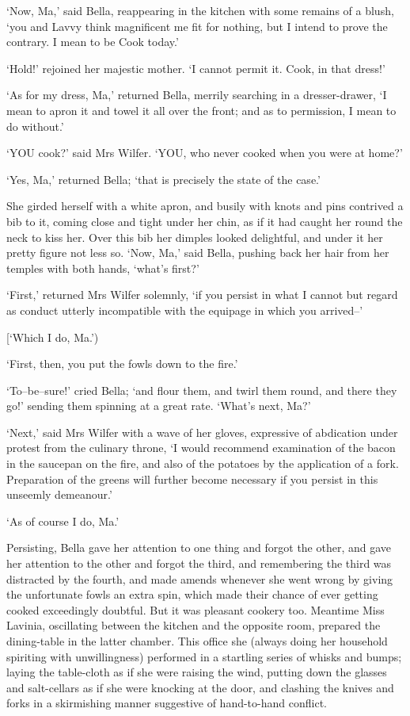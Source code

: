 ‘Now, Ma,’ said Bella, reappearing in the kitchen with some remains of a
blush, ‘you and Lavvy think magnificent me fit for nothing, but I intend
to prove the contrary. I mean to be Cook today.’

‘Hold!’ rejoined her majestic mother. ‘I cannot permit it. Cook, in that
dress!’

‘As for my dress, Ma,’ returned Bella, merrily searching in a
dresser-drawer, ‘I mean to apron it and towel it all over the front; and
as to permission, I mean to do without.’

‘YOU cook?’ said Mrs Wilfer. ‘YOU, who never cooked when you were at
home?’

‘Yes, Ma,’ returned Bella; ‘that is precisely the state of the case.’

She girded herself with a white apron, and busily with knots and pins
contrived a bib to it, coming close and tight under her chin, as if it
had caught her round the neck to kiss her. Over this bib her dimples
looked delightful, and under it her pretty figure not less so. ‘Now,
Ma,’ said Bella, pushing back her hair from her temples with both hands,
‘what’s first?’

‘First,’ returned Mrs Wilfer solemnly, ‘if you persist in what I cannot
but regard as conduct utterly incompatible with the equipage in which
you arrived--’

[‘Which I do, Ma.’)

‘First, then, you put the fowls down to the fire.’

‘To--be--sure!’ cried Bella; ‘and flour them, and twirl them round, and
there they go!’ sending them spinning at a great rate. ‘What’s next,
Ma?’

‘Next,’ said Mrs Wilfer with a wave of her gloves, expressive of
abdication under protest from the culinary throne, ‘I would recommend
examination of the bacon in the saucepan on the fire, and also of the
potatoes by the application of a fork. Preparation of the greens will
further become necessary if you persist in this unseemly demeanour.’

‘As of course I do, Ma.’

Persisting, Bella gave her attention to one thing and forgot the
other, and gave her attention to the other and forgot the third, and
remembering the third was distracted by the fourth, and made amends
whenever she went wrong by giving the unfortunate fowls an extra spin,
which made their chance of ever getting cooked exceedingly doubtful. But
it was pleasant cookery too. Meantime Miss Lavinia, oscillating between
the kitchen and the opposite room, prepared the dining-table in the
latter chamber. This office she (always doing her household spiriting
with unwillingness) performed in a startling series of whisks and bumps;
laying the table-cloth as if she were raising the wind, putting down
the glasses and salt-cellars as if she were knocking at the door, and
clashing the knives and forks in a skirmishing manner suggestive of
hand-to-hand conflict.

